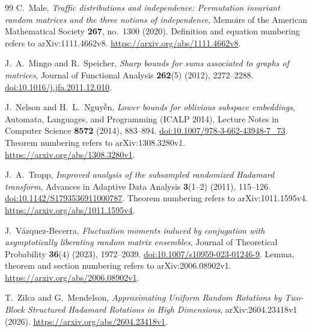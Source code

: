 \documentclass[11pt]{article}
\theoremstyle{definition}
\theoremstyle{remark}
\theoremstyle{plain}
\begin{document}
\begin{thebibliography}{99}
C.~Male,
\emph{Traffic distributions and independence: Permutation invariant
random matrices and the three notions of independence},
Memoirs of the American Mathematical Society \textbf{267},
no.~1300 (2020).
Definition and equation numbering refers to arXiv:1111.4662v8.
\url{https://arxiv.org/abs/1111.4662v8}.

J.~A.~Mingo and R.~Speicher,
\emph{Sharp bounds for sums associated to graphs of matrices},
Journal of Functional Analysis \textbf{262}(5) (2012), 2272--2288.
\href{https://doi.org/10.1016/j.jfa.2011.12.010}{doi:10.1016/j.jfa.2011.12.010}.

J.~Nelson and H.~L.~Nguy\~{\^e}n,
\emph{Lower bounds for oblivious subspace embeddings},
Automata, Languages, and Programming (ICALP 2014),
Lecture Notes in Computer Science \textbf{8572} (2014), 883--894.
\href{https://doi.org/10.1007/978-3-662-43948-7_73}{doi:10.1007/978-3-662-43948-7\_73}.
Theorem numbering refers to arXiv:1308.3280v1.
\url{https://arxiv.org/abs/1308.3280v1}.

J.~A.~Tropp,
\emph{Improved analysis of the subsampled randomized Hadamard
transform}, Advances in Adaptive Data Analysis \textbf{3}(1--2)
(2011), 115--126.
\href{https://doi.org/10.1142/S1793536911000787}{doi:10.1142/S1793536911000787}.
Theorem numbering refers to arXiv:1011.1595v4.
\url{https://arxiv.org/abs/1011.1595v4}.

J.~V\'azquez-Becerra,
\emph{Fluctuation moments induced by conjugation with asymptotically
liberating random matrix ensembles},
Journal of Theoretical Probability \textbf{36}(4) (2023), 1972--2039.
\href{https://doi.org/10.1007/s10959-023-01246-9}{doi:10.1007/s10959-023-01246-9}.
Lemma, theorem and section numbering refers to arXiv:2006.08902v1.
\url{https://arxiv.org/abs/2006.08902v1}.

T.~Zilca and G.~Mendelson,
\emph{Approximating Uniform Random Rotations by Two-Block
Structured Hadamard Rotations in High Dimensions},
arXiv:2604.23418v1 (2026).
\url{https://arxiv.org/abs/2604.23418v1}.

\end{thebibliography}
\end{document}

